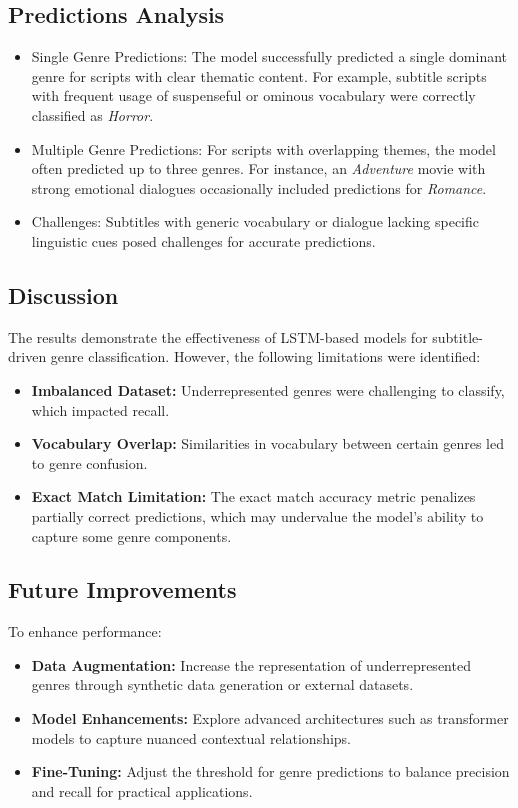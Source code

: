 \documentclass[conference]{IEEEtran}
\begin{document}
\subsection{Predictions Analysis} 

\begin{itemize}
    \item Single Genre Predictions: The model successfully predicted a single dominant genre for scripts with clear thematic content. For example, subtitle scripts with frequent usage of suspenseful or ominous vocabulary were correctly classified as \textit{Horror}.
    \item Multiple Genre Predictions: For scripts with overlapping themes, the model often predicted up to three genres. For instance, an \textit{Adventure} movie with strong emotional dialogues occasionally included predictions for \textit{Romance}.
    \item Challenges: Subtitles with generic vocabulary or dialogue lacking specific linguistic cues posed challenges for accurate predictions.
\end{itemize}

\subsection{Discussion} 

The results demonstrate the effectiveness of LSTM-based models for subtitle-driven genre classification. However, the following limitations were identified:
\begin{itemize}
    \item \textbf{Imbalanced Dataset:} Underrepresented genres were challenging to classify, which impacted recall.
    \item \textbf{Vocabulary Overlap:} Similarities in vocabulary between certain genres led to genre confusion.
    \item \textbf{Exact Match Limitation:} The exact match accuracy metric penalizes partially correct predictions, which may undervalue the model's ability to capture some genre components.
\end{itemize}

\subsection{Future Improvements} 

To enhance performance:
\begin{itemize}
    \item \textbf{Data Augmentation:} Increase the representation of underrepresented genres through synthetic data generation or external datasets.
    \item \textbf{Model Enhancements:} Explore advanced architectures such as transformer models to capture nuanced contextual relationships.
    \item \textbf{Fine-Tuning:} Adjust the threshold for genre predictions to balance precision and recall for practical applications.
\end{itemize}
\end{document}
